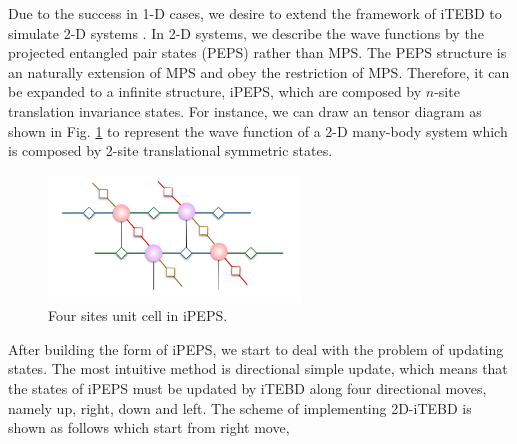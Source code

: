 Due to the success in 1-D cases, we desire to extend the framework of iTEBD to simulate 2-D systems . In 2-D systems, we describe the wave functions by the projected entangled pair states (PEPS) rather than MPS. The PEPS structure is an naturally extension of MPS and obey the restriction of MPS. Therefore, it can be expanded to a infinite structure, iPEPS, which are composed by $n$-site translation invariance states. For instance, we can draw an tensor diagram as shown in Fig. \ref{fig315} to represent the wave function of a 2-D many-body system which is composed by 2-site translational symmetric states.

\begin{figure}[ht]
	\centering
	\includegraphics[width=0.6\textwidth]{figures/fig314.png}
	\caption[The tensor diagrams of 2-D lattice]{Four sites unit cell in iPEPS.}
	\label{fig315}
\end{figure}

After building the form of iPEPS, we start to deal with the problem of updating states. The most intuitive method is directional simple update, which means that the states of iPEPS must be updated by iTEBD along four directional moves, namely up, right, down and left. The scheme of implementing 2D-iTEBD is shown as follows which start from right move,


